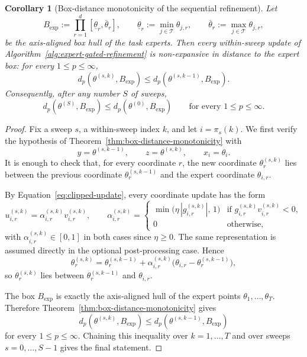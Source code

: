 \documentclass{article} %
\newcommand{\tasks}{\mathcal{T}}
\newtheorem{corollary}{Corollary}
\begin{document}
\begin{corollary}[Box-distance monotonicity of the sequential refinement]
\label{cor:algorithm-box-distance}
Let
\[
B_{\mathrm{exp}}
:=
\prod_{r=1}^d
[\underline{\theta}_r,\overline{\theta}_r],
\qquad
\underline{\theta}_r := \min_{j\in\tasks}\theta_{j,r},
\qquad
\overline{\theta}_r := \max_{j\in\tasks}\theta_{j,r},
\]
be the axis-aligned box hull of the task experts. Then every
within-sweep update of Algorithm~\ref{alg:expert-gated-refinement} is
non-expansive in distance to the expert box: for every $1\le p\le\infty$,
\[
    d_p\!\left(\theta^{(s,k)},B_{\mathrm{exp}}\right)
    \le
    d_p\!\left(\theta^{(s,k-1)},B_{\mathrm{exp}}\right).
\]
Consequently, after any number $S$ of sweeps,
\[
    d_p\!\left(\theta^{(S)},B_{\mathrm{exp}}\right)
    \le
    d_p\!\left(\theta^{(0)},B_{\mathrm{exp}}\right)
    \qquad\text{for every }1\le p\le\infty.
\]
\end{corollary}

\begin{proof}
Fix a sweep $s$, a within-sweep index $k$, and let $i=\pi_s(k)$. We first
verify the hypothesis of Theorem~\ref{thm:box-distance-monotonicity} with
\[
    y=\theta^{(s,k-1)},
    \qquad
    z=\theta^{(s,k)},
    \qquad
    x_i=\theta_i.
\]
It is enough to check that, for every coordinate $r$, the new coordinate
$\theta_r^{(s,k)}$ lies between the previous coordinate
$\theta_r^{(s,k-1)}$ and the expert coordinate $\theta_{i,r}$.

By Equation~\eqref{eq:clipped-update}, every coordinate update has the form
\[
    u_{i,r}^{(s,k)}=\alpha_{i,r}^{(s,k)}v_{i,r}^{(s,k)},
    \qquad
    \alpha_{i,r}^{(s,k)}
    =
    \begin{cases}
        \min\bigl(\eta\,|g_{i,r}^{(s,k)}|,\,1\bigr)
        & \text{if } g_{i,r}^{(s,k)}v_{i,r}^{(s,k)}<0,\\
        0 & \text{otherwise},
    \end{cases}
\]
with $\alpha_{i,r}^{(s,k)}\in[0,1]$ in both cases since $\eta\ge0$. The same
representation is assumed directly in the optional post-processing case.
Hence
\[
    \theta_r^{(s,k)}
    =
    \theta_r^{(s,k-1)}
    +
    \alpha_{i,r}^{(s,k)}
    \bigl(\theta_{i,r}-\theta_r^{(s,k-1)}\bigr),
\]
so $\theta_r^{(s,k)}$ lies between $\theta_r^{(s,k-1)}$ and $\theta_{i,r}$.

The box $B_{\mathrm{exp}}$ is exactly the axis-aligned hull of the expert
points $\theta_1,\dots,\theta_T$. Therefore
Theorem~\ref{thm:box-distance-monotonicity} gives
\[
    d_p\!\left(\theta^{(s,k)},B_{\mathrm{exp}}\right)
    \le
    d_p\!\left(\theta^{(s,k-1)},B_{\mathrm{exp}}\right)
\]
for every $1\le p\le\infty$. Chaining this inequality over
$k=1,\dots,T$ and over sweeps $s=0,\dots,S-1$ gives the final statement.
\end{proof}
\end{document}
